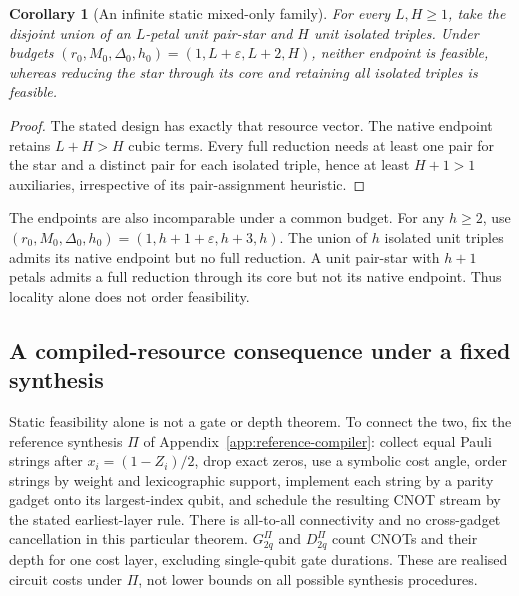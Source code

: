 \documentclass[a4paper,onecolumn,11pt,unpublished]{quantumarticle}
\newtheorem{corollary}[corollary]{Corollary}
\theoremstyle{remark}
\begin{document}
\begin{corollary}[An infinite static mixed-only family]
\label{cor:static-star-isolated}
For every $L,H\geq1$, take the disjoint union of an $L$-petal unit pair-star
and $H$ unit isolated triples. Under budgets
$(r_0,M_0,\Delta_0,h_0)=(1,L+\varepsilon,L+2,H)$,
neither endpoint is feasible, whereas reducing the star through its core
and retaining all isolated triples is feasible.
\end{corollary}
\begin{proof}
The stated design has exactly that resource vector. The native endpoint
retains $L+H>H$ cubic terms. Every full reduction needs at least one pair
for the star and a distinct pair for each isolated triple, hence at least
$H+1>1$ auxiliaries, irrespective of its pair-assignment heuristic.
\end{proof}

The endpoints are also incomparable under a common budget. For any
$h\geq2$, use $(r_0,M_0,\Delta_0,h_0)=(1,h+1+\varepsilon,h+3,h)$.
The union of $h$ isolated unit triples admits its native endpoint but no
full reduction. A unit pair-star with $h+1$ petals admits a full reduction
through its core but not its native endpoint. Thus locality alone does not
order feasibility.

\subsection{A compiled-resource consequence under a fixed synthesis}
\label{sec:compiled-phase-corollary}
Static feasibility alone is not a gate or depth theorem. To connect the two,
fix the reference synthesis $\Pi$ of
Appendix~\ref{app:reference-compiler}: collect equal Pauli strings after
$x_i=(1-Z_i)/2$, drop exact zeros, use a symbolic cost angle, order strings
by weight and lexicographic support, implement each string by a parity
gadget onto its largest-index qubit, and schedule the resulting CNOT stream
by the stated earliest-layer rule. There is all-to-all connectivity and no
cross-gadget cancellation in this particular theorem. $G_{2q}^\Pi$ and
$D_{2q}^\Pi$ count CNOTs and their depth for one cost layer, excluding
single-qubit gate durations. These are realised circuit costs under $\Pi$,
not lower bounds on all possible synthesis procedures.
\end{document}
